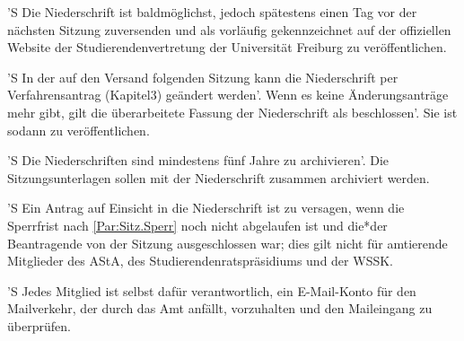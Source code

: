 \documentclass[fontsize=12pt,parskip=half, ref=short]{scrartcl}
\begin{document}
\begin{contract}
  'S Die Niederschrift ist baldmöglichst, jedoch spätestens einen Tag vor der
  nächsten Sitzung zuversenden und als vorläufig gekennzeichnet auf der
  offiziellen Website der Studierendenvertretung der Universität Freiburg zu
  veröffentlichen.

  'S In der auf den Versand folgenden Sitzung kann die Niederschrift per
  Verfahrensantrag (Kapitel3) geändert werden'. Wenn es keine Änderungsanträge
  mehr gibt, gilt die überarbeitete Fassung der Niederschrift als beschlossen'.
  Sie ist sodann zu veröffentlichen.

  'S Die Niederschriften sind mindestens fünf Jahre zu archivieren'. Die
  Sitzungsunterlagen sollen mit der Niederschrift zusammen archiviert werden.

  'S Ein Antrag auf Einsicht in die Niederschrift ist zu versagen, wenn die
  Sperrfrist nach \ref{Par:Sitz.Sperr} noch nicht abgelaufen ist und die*der
  Beantragende von der Sitzung ausgeschlossen war; dies gilt nicht für
  amtierende Mitglieder des AStA, des Studierendenratspräsidiums und der WSSK.

  \label{Par:Elek-Med}
  'S Jedes Mitglied ist selbst dafür verantwortlich, ein E-Mail-Konto für den
  Mailverkehr, der durch das Amt anfällt, vorzuhalten und den Maileingang zu
  überprüfen.
\end{contract}
\end{document}

